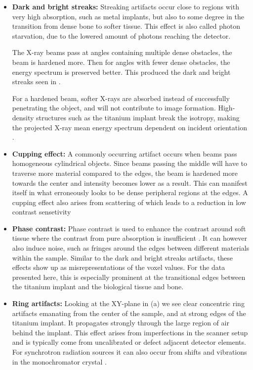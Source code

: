 \begin{itemize}
  \item \textbf{Dark and bright streaks:} Streaking artifacts occur close to
	regions with very high absorption, such as metal implants, but also
	to some degree in the transition from dense bone to softer
	tissue.
	This effect is also called photon starvation, due to the
	lowered amount of photons reaching the detector.

	The X-ray beams pass at angles containing
	multiple dense obstacles, the beam is hardened more. Then for
	angles with fewer dense obstacles, the energy spectrum is
	preserved better. This produced the dark and bright streaks
	seen in .

	For a hardened beam, softer X-rays are absorbed instead of
	successfully penetrating the object, and will not contribute to
	image formation.  High-density structures such as the titanium
	implant break the isotropy, making the projected X-ray mean
	energy spectrum dependent on incident orientation
	\citep{srnoise}.


  \item \textbf{Cupping effect:} A commonly occurring artifact occurs when beams pass
    homogeneous cylindrical objects. Since beams passing the middle will have to
	traverse more material compared to the edges, the beam is hardened more
	towards the center and intensity becomes lower as a result. This can
	manifest itself in what erroneously looks to be dense peripheral
	regions at the edges. A cupping effect also arises from scattering of
	which leads to a reduction in low contrast sensetivity

  \item \textbf{Phase contrast:} Phase contrast is used to enhance the contrast
	around soft tissue where the contrast from pure absorption is
	insufficient \citep{phasecontrast}. It can however also induce
	noise, such as fringes around the edges between different
	materials within the sample\citep{srnoise}. Similar to the dark
	and bright streaks artifacts, these effects show up as
	misrepresentations of the voxel values. For the data presented
	here, this is especially prominent at the transitional edges
	between the titanium implant and the biological tissue and
	bone.

  \item \textbf{Ring artifacts:} Looking at the XY-plane in
  	(a) we see clear concentric ring artifacts emanating
	from the center of the sample, and at strong edges of the
	titanium implant. It propagates strongly through the large
	region of air behind the implant. This effect arises from
	imperfections in the scanner setup and is typically come from
	uncalibrated or defect adjacent detector elements. For
	synchrotron radiation sources it can also occur from shifts and
	vibrations in the monochromator crystal \citep{ringartefacts}.


\end{itemize}
